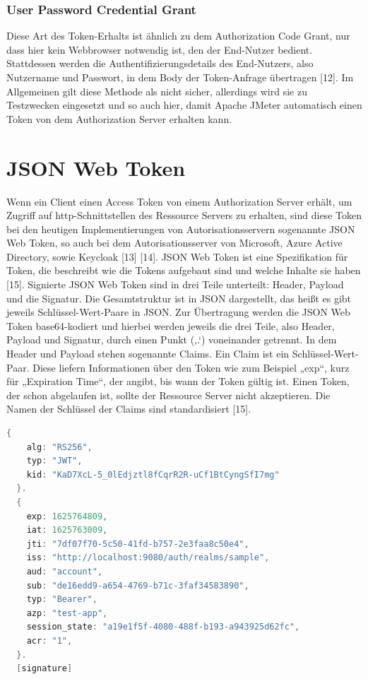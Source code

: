 \subsubsection{User Password Credential Grant}
\label{ssubsec:OAuth2:ErhaltvonToken:UserPasswordCredentialGrant}
Diese Art des Token-Erhalts ist ähnlich zu dem Authorization Code Grant, nur dass hier kein Webbrowser notwendig ist, den der End-Nutzer bedient. Stattdessen werden die Authentifizierungsdetails des End-Nutzers, also Nutzername und Passwort, in dem Body der Token-Anfrage übertragen [12]. Im Allgemeinen gilt diese Methode als nicht sicher, allerdings wird sie zu Testzwecken eingesetzt und so auch hier, damit Apache JMeter automatisch einen Token von dem Authorization Server erhalten kann.

\section{JSON Web Token}
\label{sec:JSONWebToken}
Wenn ein Client einen Access Token von einem Authorization Server erhält, um Zugriff auf http-Schnittstellen des Ressource Servers zu erhalten, sind diese Token bei den heutigen Implementierungen von Autorisationsservern sogenannte \ac{JSON} Web Token, so auch bei dem Autorisationsserver von Microsoft, Azure Active Directory, sowie Keycloak [13] [14]. 
JSON Web Token ist eine Spezifikation für Token, die beschreibt wie die Tokens aufgebaut sind und welche Inhalte sie haben [15].
Signierte JSON Web Token sind in drei Teile unterteilt: Header, Payload und die Signatur. Die Gesamtstruktur ist in JSON dargestellt, das heißt es gibt jeweils Schlüssel-Wert-Paare in JSON. Zur Übertragung werden die JSON Web Token base64-kodiert und hierbei werden jeweils die drei Teile, also Header, Payload und Signatur, durch einen Punkt (‚.‘) voneinander getrennt. 
In dem Header und Payload stehen sogenannte Claims. Ein Claim ist ein Schlüssel-Wert-Paar. Diese liefern Informationen über den Token wie zum Beispiel „exp“, kurz für „Expiration Time“, der angibt, bis wann der Token gültig ist. Einen Token, der schon abgelaufen ist, sollte der Ressource Server nicht akzeptieren. Die Namen der Schlüssel der Claims sind standardisiert [15]. 


\begin{lstlisting}[language=C++,frame=tb,caption={Beispiel JSON Web Token},label=lst:BeispielJSONWebToken]
  {
    alg: "RS256",
    typ: "JWT",
    kid: "KaD7XcL-5_0lEdjztl8fCqrR2R-uCf1BtCyngSfI7mg"
  }.
  {
    exp: 1625764809,
    iat: 1625763009,
    jti: "7df07f70-5c50-41fd-b757-2e3faa8c50e4",
    iss: "http://localhost:9080/auth/realms/sample",
    aud: "account",
    sub: "de16edd9-a654-4769-b71c-3faf34583890",
    typ: "Bearer",
    azp: "test-app",
    session_state: "a19e1f5f-4080-488f-b193-a943925d62fc",
    acr: "1",
  }.
  [signature]   
\end{lstlisting}

